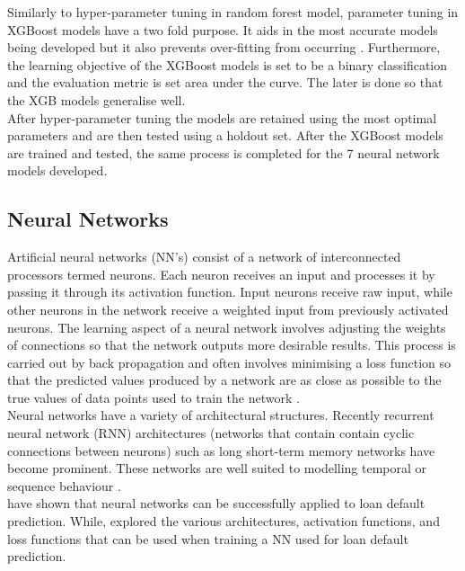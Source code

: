 Similarly to hyper-parameter tuning in random forest model, parameter tuning in XGBoost models have a two fold purpose. It aids in the most accurate models being developed but it also prevents over-fitting from occurring \parencite{xgb_tuning}. Furthermore, the learning objective of the XGBoost models is set to be a binary classification and the evaluation metric is set area under the curve. The later is done so that the XGB models generalise well. \\

After hyper-parameter tuning the models are retained using the most optimal parameters and are then tested using a holdout set. After the XGBoost models are trained and tested, the same process is completed for the 7 neural network models developed.  


\subsection{Neural Networks}

Artificial neural networks (NN's) consist of a network of interconnected processors termed neurons. Each neuron receives an input and processes it by passing it through its activation function. Input neurons receive raw input, while other neurons in the network receive a weighted input from previously activated neurons. The learning aspect of a neural network involves adjusting the weights of connections so that the network outputs more desirable results. This process is carried out by back propagation and often involves minimising a loss function so that the predicted values produced by a network are as close as possible to the true values of data points used to train the network \parencite{NNOverview}. \\ 

Neural networks have a variety of architectural structures. Recently recurrent neural network (RNN) architectures (networks that contain contain cyclic connections between neurons) such as long short-term memory networks have become prominent. These networks are well suited to modelling temporal or sequence behaviour \parencite{LSTM}. \\

\textcite{DecTreesZekic} have shown that neural networks can be successfully applied to loan default prediction. While, \textcite{NNWest} explored the various architectures, activation functions, and loss functions that can be used when training a NN used for loan default prediction. \\

